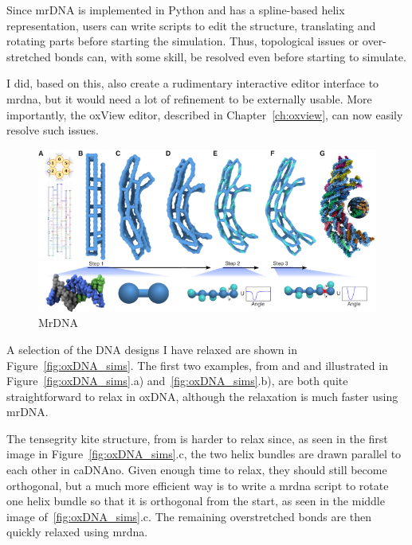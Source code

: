 Since mrDNA is implemented in Python and has a spline-based helix representation, users can write scripts to edit the structure, translating and rotating parts before starting the simulation. Thus, topological issues or over-stretched bonds can, with some skill, be resolved even before starting to simulate.

I did, based on this, also create a rudimentary interactive editor interface to mrdna, but it would need a lot of refinement to be externally usable. More importantly, the oxView editor, described in Chapter~\ref{ch:oxview}, can now easily resolve such issues.

\begin{figure}[ht]
  \begin{center}
    \includegraphics[width=\textwidth]{figures/mrDNA.jpg}
    \caption{MrDNA}
    \label{fig:mrdna}
  \end{center}
\end{figure}


A selection of the DNA designs I have relaxed are shown in Figure~\ref{fig:oxDNA_sims}. The first two examples, from \cite{gerling2015dynamic} and \cite{zadegan2012smallbox} and illustrated in Figure~\ref{fig:oxDNA_sims}.a) and~\ref{fig:oxDNA_sims}.b), are both quite straightforward to relax in oxDNA, although the relaxation is much faster using mrDNA.

The tensegrity kite structure, from \cite{liedl2010_kite} is harder to relax since, as seen in the first image in Figure~\ref{fig:oxDNA_sims}.c, the two helix bundles are drawn parallel to each other in caDNAno. Given enough time to relax, they should still become orthogonal, but a much more efficient way is to write a mrdna script to rotate one helix bundle so that it is orthogonal from the start, as seen in the middle image of~\ref{fig:oxDNA_sims}.c. The remaining overstretched bonds are then quickly relaxed using mrdna.

